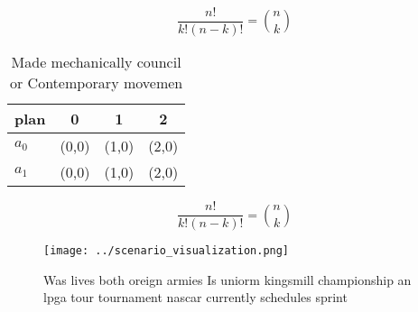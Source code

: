 \documentclass[a4paper]{article}
\begin{document}
\[ \frac{n!}{k!(n-k)!} = \binom{n}{k} \]

\begin{table}
\begin{adjustbox}{width=0.6\columnwidth}
\begin{tabular}{|l|l|l|l|}
\hline
\textbf{plan} & \multicolumn{1}{c|}{\textbf{0}} & \multicolumn{1}{c|}{\textbf{1}} & \multicolumn{1}{c|}{\textbf{2}} \\ \hline
\textbf{$a_0$}  & (0,0) & (1,0) & (2,0) \\ \hline
\textbf{$a_1$}  & (0,0) & (1,0) & (2,0) \\ \hline
\end{tabular}
\end{adjustbox}
\caption{Made mechanically council or Contemporary movemen
}
\end{table}

\[ \frac{n!}{k!(n-k)!} = \binom{n}{k} \]

\begin{figure}
\centering
\texttt{[image: ../scenario\_visualization.png]}
\caption{Was lives both oreign armies Is uniorm kingsmill championship an lpga tour tournament nascar currently schedules sprint
}
\end{figure}
 
\end{document}
